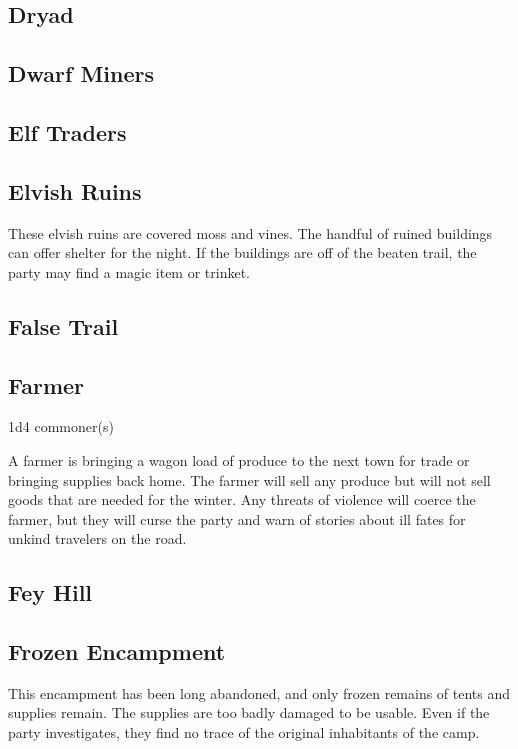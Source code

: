 \subsection{Dryad}

\subsection{Dwarf Miners}

\subsection{Elf Traders}

\subsection{Elvish Ruins}

These elvish ruins are covered moss and vines.
The handful of ruined buildings can offer shelter for the night.
If the buildings are off of the beaten trail, the party may find a magic item or trinket.

\subsection{False Trail}

\subsection{Farmer}

1d4 commoner(s)

A farmer is bringing a wagon load of produce to the next town for trade or bringing supplies back home.
The farmer will sell any produce but will not sell goods that are needed for the winter.
Any threats of violence will coerce the farmer, but they will curse the party and warn of stories about ill fates for unkind travelers on the road.

\subsection{Fey Hill}

\subsection{Frozen Encampment}

This encampment has been long abandoned, and only frozen remains of tents and supplies remain.
The supplies are too badly damaged to be usable.
Even if the party investigates, they find no trace of the original inhabitants of the camp.

